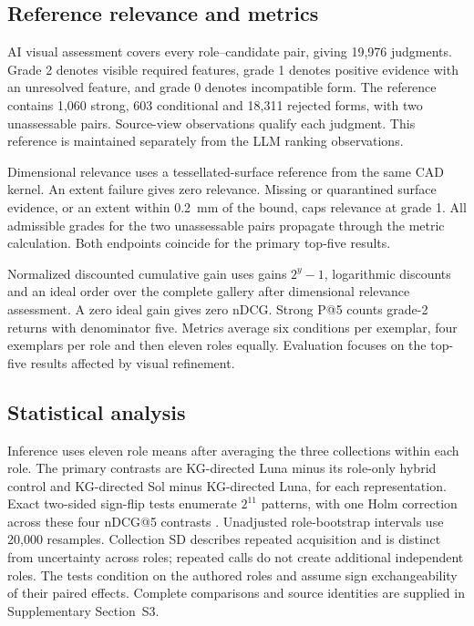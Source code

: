 \documentclass[10pt,a4paper,twocolumn]{article}
\begin{document}
\subsection{Reference relevance and metrics}

AI visual assessment covers every role--candidate pair, giving 19,976 judgments. Grade 2 denotes visible required features, grade 1 denotes positive evidence with an unresolved feature, and grade 0 denotes incompatible form. The reference contains 1,060 strong, 603 conditional and 18,311 rejected forms, with two unassessable pairs. Source-view observations qualify each judgment. This reference is maintained separately from the LLM ranking observations.

Dimensional relevance uses a tessellated-surface reference from the same CAD kernel. An extent failure gives zero relevance. Missing or quarantined surface evidence, or an extent within 0.2~mm of the bound, caps relevance at grade 1. All admissible grades for the two unassessable pairs propagate through the metric calculation. Both endpoints coincide for the primary top-five results.

Normalized discounted cumulative gain \cite{jarvelin2002gain} uses gains $2^y-1$, logarithmic discounts and an ideal order over the complete gallery after dimensional relevance assessment. A zero ideal gain gives zero nDCG. Strong P@5 counts grade-2 returns with denominator five. Metrics average six conditions per exemplar, four exemplars per role and then eleven roles equally. Evaluation focuses on the top-five results affected by visual refinement.









\subsection{Statistical analysis}

Inference uses eleven role means after averaging the three collections within
each role. The primary contrasts are KG-directed Luna minus its role-only hybrid
control and KG-directed Sol minus KG-directed Luna, for each representation.
Exact two-sided sign-flip tests enumerate $2^{11}$ patterns, with one Holm
correction across these four nDCG@5 contrasts \cite{holm1979procedure}.
Unadjusted role-bootstrap intervals use 20,000 resamples. Collection SD describes
repeated acquisition and is distinct from uncertainty across roles; repeated calls
do not create additional independent roles. The tests condition on the authored
roles and assume sign exchangeability of their paired effects. Complete comparisons and source
identities are supplied in Supplementary Section~S3.
\end{document}
